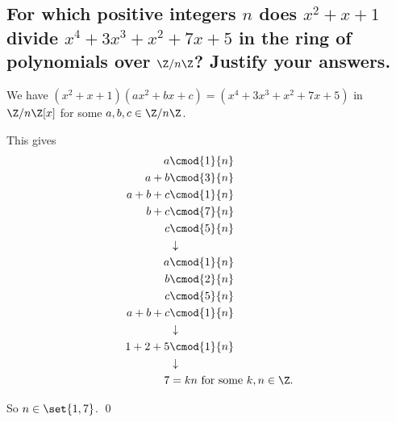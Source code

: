 













    \subsection[(iii)]{For which positive integers $n$ does $x^2+x+1$ divide $x^4+3x^3+x^2+7x+5$
        in the ring of polynomials over $\Z / n\Z$? Justify your answers.}


        We have $(x^2 + x +1)(ax^2 + bx + c) = (x^4 + 3x^3 + x^2 + 7x+5)$ in $\Z/n\Z[x]$ 
        for some $a,b,c\in \Z/n\Z$.

        This gives 
        \begin{align*}
            a &\cmod{1}{n} \\
            a + b &\cmod{3}{n} \\
            a + b + c &\cmod{1}{n} \\
            b + c &\cmod{7}{n} \\
            c &\cmod{5}{n} \\
            &\downarrow \\
            a &\cmod{1}{n} \\
            b &\cmod{2}{n} \\
            c &\cmod{5}{n} \\
            a + b + c &\cmod{1}{n} \\
            &\downarrow \\
            1 + 2 + 5 &\cmod{1}{n} \\
            &\downarrow \\
            7 &= kn \text{ for some $k,n \in \Z$.}
        \end{align*}

        So $n \in \set{1,7}$.
        \qed